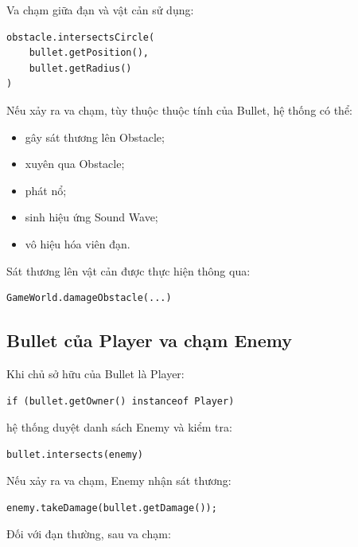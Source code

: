 \documentclass[12pt,a4paper]{report}
\begin{document}
    Va chạm giữa đạn và vật cản sử dụng:

    \begin{verbatim}
obstacle.intersectsCircle(
    bullet.getPosition(),
    bullet.getRadius()
)
    \end{verbatim}

    Nếu xảy ra va chạm, tùy thuộc thuộc tính của Bullet,
    hệ thống có thể:

    \begin{itemize}
        \item gây sát thương lên Obstacle;
        \item xuyên qua Obstacle;
        \item phát nổ;
        \item sinh hiệu ứng Sound Wave;
        \item vô hiệu hóa viên đạn.
    \end{itemize}

    Sát thương lên vật cản được thực hiện thông qua:

    \begin{verbatim}
GameWorld.damageObstacle(...)
    \end{verbatim}



    \subsection{Bullet của Player va chạm Enemy}

    Khi chủ sở hữu của Bullet là Player:

    \begin{verbatim}
if (bullet.getOwner() instanceof Player)
    \end{verbatim}

    hệ thống duyệt danh sách Enemy và kiểm tra:

    \begin{verbatim}
bullet.intersects(enemy)
    \end{verbatim}

    Nếu xảy ra va chạm, Enemy nhận sát thương:

    \begin{verbatim}
enemy.takeDamage(bullet.getDamage());
    \end{verbatim}

    Đối với đạn thường, sau va chạm:
\end{document}
